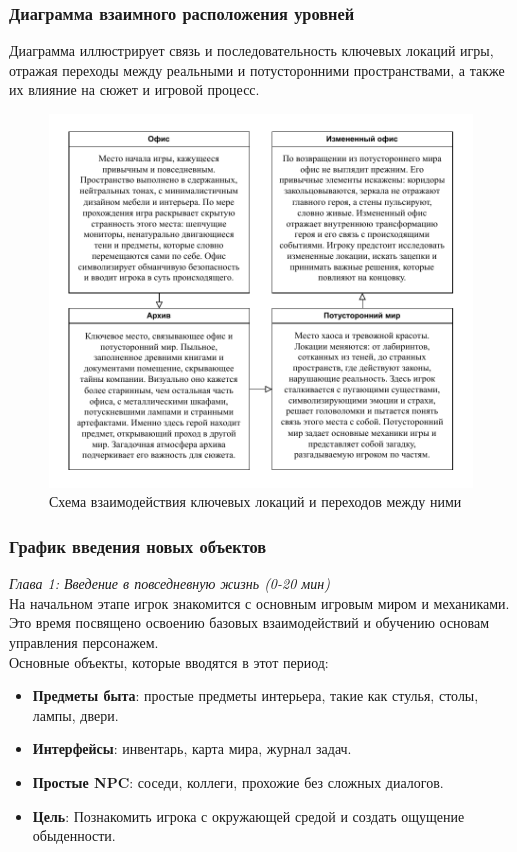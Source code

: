 \documentclass{article}
\begin{document}
	\newpage
	\subsubsection{Диаграмма взаимного расположения уровней}
	
	Диаграмма иллюстрирует связь и последовательность ключевых локаций игры, отражая переходы между реальными и потусторонними пространствами, а также их влияние на сюжет и игровой процесс.
	
	\begin{figure}[h!]
		\centering
		\includegraphics[width=\textwidth]{images/Локации.pdf} 
		\caption{Схема взаимодействия ключевых локаций и переходов между ними}
		\label{fig:pdf-example3}
	\end{figure}
	
	\newpage
	\subsubsection{График введения новых объектов}
	\textit{Глава 1: Введение в повседневную жизнь (0-20 мин)}\\
	На начальном этапе игрок знакомится с основным игровым миром и механиками. Это время посвящено освоению базовых взаимодействий и обучению основам управления персонажем.\\ Основные объекты, которые вводятся в этот период:
	\begin{itemize}
		\item \textbf{Предметы быта}: простые предметы интерьера, такие как стулья, столы, лампы, двери.
		\item \textbf{Интерфейсы}: инвентарь, карта мира, журнал задач.
		\item \textbf{Простые NPC}: соседи, коллеги, прохожие без сложных диалогов.
		\item \textbf{Цель}: Познакомить игрока с окружающей средой и создать ощущение обыденности.
	\end{itemize}
	
\end{document}
